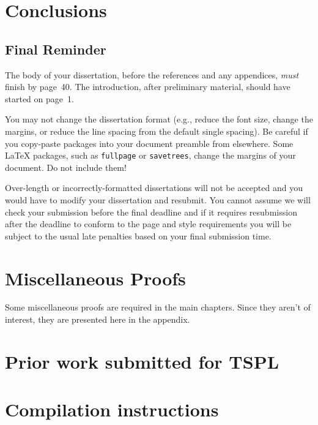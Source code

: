 \documentclass[logo,bsc,singlespacing,parskip,online]{infthesis}
\begin{document}
\chapter{Conclusions}

\section{Final Reminder}

The body of your dissertation, before the references and any appendices,
\emph{must} finish by page~40. The introduction, after preliminary material,
should have started on page~1.

You may not change the dissertation format (e.g., reduce the font size, change
the margins, or reduce the line spacing from the default single spacing). Be
careful if you copy-paste packages into your document preamble from elsewhere.
Some \LaTeX{} packages, such as \texttt{fullpage} or \texttt{savetrees}, change
the margins of your document. Do not include them!

Over-length or incorrectly-formatted dissertations will not be accepted and you
would have to modify your dissertation and resubmit. You cannot assume we will
check your submission before the final deadline and if it requires resubmission
after the deadline to conform to the page and style requirements you will be
subject to the usual late penalties based on your final submission time.





\appendix

\chapter{Miscellaneous Proofs}
\label{appendix:misc_proofs}

Some miscellaneous proofs are required in the main chapters. Since they aren't of interest, they are presented here in the appendix.



\chapter{Prior work submitted for TSPL}
\label{appendix:tspl}


\chapter{Compilation instructions}
\label{appendix:compilation_instructions}
\end{document}
